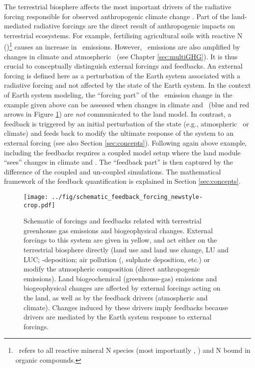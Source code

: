 The terrestrial biosphere affects the most important drivers of the radiative forcing responsible for observed anthropogenic climate change \citep{spm13ipcc}. Part of the land-mediated radiative forcings are the direct result of anthropogenic impacts on terrestrial ecosystems. For example, fertilising agricultural soils with reactive N (\nr )\footnote{\nr\ refers to all reactive mineral N species (most importantly \nhy , \nox ) and N bound in organic compounds.} causes an increase in \nno\ emissions. However, \nno\ emissions are also amplified by changes in climate and atmospheric \coo\ (see Chapter \ref{sec:multiGHG}). It is thus crucial to conceptually distinguish external forcings and feedbacks. An external forcing is defined here as a perturbation of the Earth system associated with a radiative forcing and not affected by the state of the Earth system. In the context of Earth system modeling, the ``forcing part'' of the \nno\ emission change in the example given above can be assessed when changes in climate and \coo\ (blue and red arrows in Figure \ref{fig:schematic_fb_frc}) are {\it not} communicated to the land model. In contrast, a feedback is triggered by an initial perturbation of the state (e.g., atmospheric \coo\ or climate) and feeds back to modify the ultimate response of the system to an external forcing (see also Section \ref{sec:concepts}). Following again above example, including the feedbacks requires a coupled model setup where the land module ``sees'' changes in climate and \coo . The ``feedback part'' is then captured by the difference of the coupled and un-coupled simulations. The mathematical framework of the feedback quantification is explained in Section \ref{sec:concepts}.
\begin{figure}[h]
\begin{center}
  \texttt{[image: ../fig/schematic\_feedback\_forcing\_newstyle-crop.pdf]}
\end{center}
  \caption[Schematic of forcings and feedbacks related with terrestrial biosphere]{Schematic of forcings and feedbacks related with terrestrial greenhouse gas emissions and biogeophysical changes. External forcings to this system are given in yellow, and act either on the terrestrial biosphere directly (land use and land use change, LU and LUC; \nr -deposition; air pollution (\ooot, sulphate deposition, etc.) or modify the atmospheric composition (direct anthropogenic emissions). Land biogeochemical (greenhouse-gas) emissions and biogeophysical changes are affected by external forcings acting on the land, as well as by the feedback drivers (atmospheric \coo and climate). Changes induced by these drivers imply feedbacks because drivers are mediated by the Earth system response to external forcings.}
\label{fig:schematic_fb_frc}
\end{figure}

